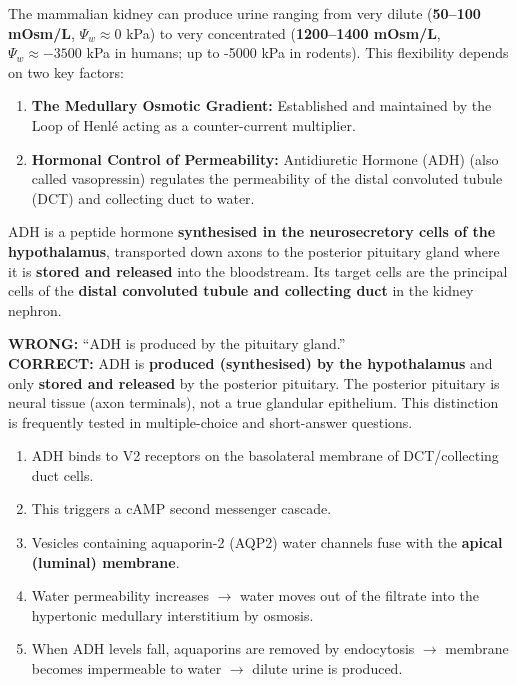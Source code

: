 \documentclass[11pt]{article}
\newcommand{\cle}[1]{{\popxbold\color{popdark}#1}}
\begin{document}
The mammalian kidney can produce urine ranging from very dilute (\textbf{50--100 mOsm/L}, $\Psi_w \approx 0$ kPa) to very concentrated (\textbf{1200--1400 mOsm/L}, $\Psi_w \approx -3500$ kPa in humans; up to -5000 kPa in rodents). This flexibility depends on two key factors:
\begin{enumerate}
    \item \textbf{The Medullary Osmotic Gradient:} Established and maintained by the \cle{Loop of Henlé} acting as a \cle{counter-current multiplier}.
    \item \textbf{Hormonal Control of Permeability:} \cle{Antidiuretic Hormone (ADH)} (also called \cle{vasopressin}) regulates the permeability of the \cle{distal convoluted tubule (DCT)} and \cle{collecting duct} to water.
\end{enumerate}

\begin{definition}
ADH is a peptide hormone \textbf{synthesised in the neurosecretory cells of the \cle{hypothalamus}}, transported down axons to the \cle{posterior pituitary gland} where it is \textbf{stored and released} into the bloodstream. Its target cells are the principal cells of the \textbf{distal convoluted tubule and collecting duct} in the kidney nephron.
\end{definition}

\begin{attention}
\textbf{WRONG:} ``ADH is produced by the pituitary gland.'' \\
\textbf{CORRECT:} ADH is \textbf{produced (synthesised) by the hypothalamus} and only \textbf{stored and released} by the posterior pituitary. The posterior pituitary is neural tissue (axon terminals), not a true glandular epithelium. This distinction is frequently tested in multiple-choice and short-answer questions.
\end{attention}

\begin{propriete}
\begin{enumerate}
    \item ADH binds to \cle{V2 receptors} on the basolateral membrane of DCT/collecting duct cells.
    \item This triggers a cAMP second messenger cascade.
    \item Vesicles containing \cle{aquaporin-2 (AQP2) water channels} fuse with the \textbf{apical (luminal) membrane}.
    \item Water permeability increases $\rightarrow$ water moves out of the filtrate into the hypertonic medullary interstitium by osmosis.
    \item When ADH levels fall, aquaporins are removed by endocytosis $\rightarrow$ membrane becomes impermeable to water $\rightarrow$ dilute urine is produced.
\end{enumerate}
\end{propriete}
\end{document}
